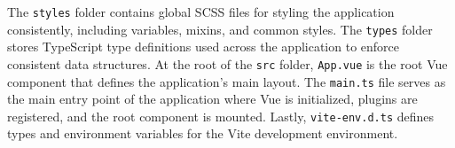 The \texttt{styles}
folder contains global SCSS files for styling the application consistently, including variables, mixins, and common
styles. The \texttt{types}
folder stores TypeScript type definitions used across the application to enforce consistent data structures. At the root
of the \texttt{src} folder, \texttt{App.vue} is the root Vue component that defines the application’s main layout. The
\texttt{main.ts}
file serves as the main entry point of the application where Vue is initialized, plugins are registered, and the root
component is mounted. Lastly, \texttt{vite-env.d.ts}
defines types and environment variables for the Vite development environment.

